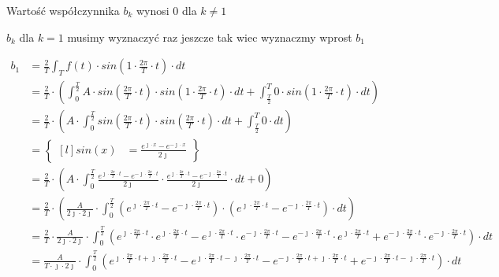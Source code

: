 Wartość współczynnika $b_k$ wynosi $0$ dla $k\neq 1$

$b_k$ dla $k=1$ musimy wyznaczyć raz jeszcze tak wiec wyznaczmy wprost $b_1$

\begin{align*}
b_1&=\frac{2}{T}\int_{T}f(t) \cdot sin\left( 1 \cdot \frac{2\pi}{T} \cdot t\right) \cdot dt\\
&=\frac{2}{T}\cdot\left(\int_{0}^{\frac{T}{2}}A \cdot sin\left( \frac{2\pi}{T} \cdot t\right) \cdot sin\left( 1 \cdot \frac{2\pi}{T} \cdot t\right) \cdot dt+\int_{\frac{T}{2}}^{T} 0 \cdot sin\left( 1 \cdot \frac{2\pi}{T} \cdot t\right) \cdot dt\right)\\
&=\frac{2}{T}\cdot\left(A \cdot \int_{0}^{\frac{T}{2}}sin\left( \frac{2\pi}{T} \cdot t\right) \cdot sin\left( \frac{2\pi}{T} \cdot t\right) \cdot dt+\int_{\frac{T}{2}}^{T} 0 \cdot dt\right)\\
&=\begin{Bmatrix*}[l]
sin\left(x\right)&=\frac{e^{\jmath \cdot x}-e^{-\jmath \cdot x}}{2 \jmath }
\end{Bmatrix*}\\
&=\frac{2}{T}\cdot\left(A \cdot \int_{0}^{\frac{T}{2}} \frac{e^{\jmath \cdot \frac{2\pi}{T} \cdot t}-e^{-\jmath \cdot \frac{2\pi}{T} \cdot t}}{2\jmath} \cdot \frac{e^{\jmath \cdot \frac{2\pi}{T} \cdot t}-e^{-\jmath \cdot \frac{2\pi}{T} \cdot t}}{2\jmath} \cdot dt+0\right)\\
&=\frac{2}{T}\cdot\left(\frac{A}{2\jmath\cdot 2\jmath} \cdot \int_{0}^{\frac{T}{2}} \left(e^{\jmath \cdot \frac{2\pi}{T} \cdot t}-e^{-\jmath \cdot \frac{2\pi}{T} \cdot t}\right)\cdot \left(e^{\jmath \cdot \frac{2\pi}{T} \cdot t}-e^{-\jmath \cdot \frac{2\pi}{T} \cdot t}\right) \cdot dt\right)\\
&=\frac{2}{T} \cdot \frac{A}{2\jmath\cdot 2\jmath} \cdot \int_{0}^{\frac{T}{2}} \left(e^{\jmath \cdot \frac{2\pi}{T} \cdot t} \cdot e^{\jmath \cdot \frac{2\pi}{T} \cdot t} - e^{\jmath \cdot \frac{2\pi}{T} \cdot t} \cdot e^{-\jmath \cdot \frac{2\pi}{T} \cdot t} - e^{-\jmath \cdot \frac{2\pi}{T} \cdot t} \cdot e^{\jmath \cdot \frac{2\pi}{T} \cdot t} + e^{-\jmath \cdot \frac{2\pi}{T} \cdot t} \cdot e^{-\jmath \cdot \frac{2\pi}{T} \cdot t} \right) \cdot dt\\
&=\frac{A}{T\cdot \jmath \cdot 2\jmath} \cdot \int_{0}^{\frac{T}{2}} \left(e^{\jmath \cdot \frac{2\pi}{T} \cdot t + \jmath \cdot \frac{2\pi}{T} \cdot t} - e^{\jmath \cdot \frac{2\pi}{T} \cdot t -\jmath \cdot \frac{2\pi}{T} \cdot t} - e^{-\jmath \cdot \frac{2\pi}{T} \cdot t+ \jmath \cdot \frac{2\pi}{T} \cdot t} + e^{-\jmath \cdot \frac{2\pi}{T} \cdot t -\jmath \cdot \frac{2\pi}{T} \cdot t} \right) \cdot dt\\

\end{align*}
